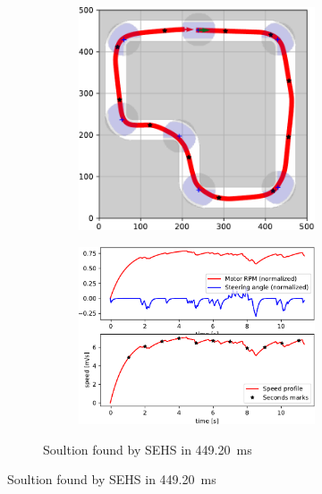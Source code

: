 \begin{figure}[!tbp]
	\vspace{0.75cm}
	
	\begin{subfigure}[t]{\textwidth}
		\begin{subfigure}[t]{0.45\textwidth}
			\includegraphics[width=\textwidth]{../img/experiments/simple-sehs-trajectory}
		\end{subfigure}
		\hfill
		\begin{subfigure}[t]{0.45\textwidth}
			\includegraphics[width=\textwidth]{../img/experiments/simple-sehs-actuators}
		\end{subfigure}
		\caption{Soultion found by SEHS in \SI{449.20}{\milli\second}}
		\label{fig:simple-sehs}
	\end{subfigure}


\end{figure}
